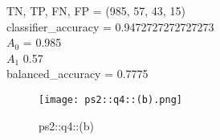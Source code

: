 \begin{answer}

TN, TP, FN, FP = (985, 57, 43, 15) \\
classifier\_accuracy = 0.9472727272727273 \\
$A_0$ = 0.985 \\ 
$A_1$ 0.57 \\ 
balanced\_accuracy = 0.7775 \\

\begin{figure}[H]
    \centering
    \texttt{[image: ps2::q4::(b).png]}
    \caption{ps2::q4::(b)}
    \label{fig:enter-label}
\end{figure}
\end{answer}